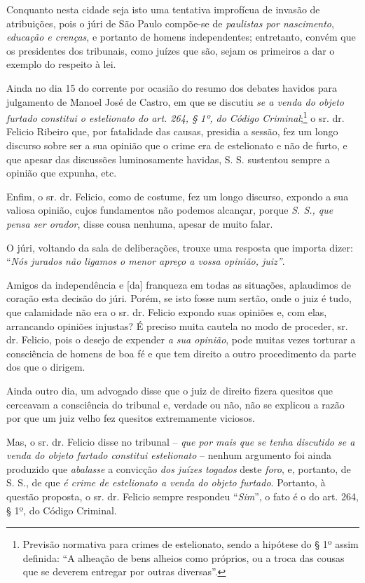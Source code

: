 {Conquanto nesta cidade seja isto uma tentativa improfícua de invasão de
atribuições, pois o júri de São Paulo compõe-se de \emph{paulistas por
nascimento}, \emph{educação e crenças}, e portanto de homens
independentes; entretanto, convém que os presidentes dos tribunais, como
juízes que são, sejam os primeiros a dar o exemplo do respeito à lei.

Ainda no dia 15 do corrente por ocasião do resumo dos debates havidos
para julgamento de Manoel José de Castro, em que se discutiu \emph{se a
venda do objeto furtado constitui o estelionato do art. 264, § 1º, do
Código Criminal};\footnote{ Previsão normativa para crimes de
  estelionato, sendo a hipótese do § 1º assim definida: ``A alheação de
  bens alheios como próprios, ou a troca das cousas que se deverem
  entregar por outras diversas''.} o sr. dr. Felicio Ribeiro que, por
fatalidade das causas, presidia a sessão, fez um longo discurso sobre
ser a sua opinião que o crime era de estelionato e não de furto, e que
apesar das discussões luminosamente havidas, S. S. sustentou sempre a
opinião que expunha, etc.

Enfim, o sr. dr. Felicio, como de costume, fez um longo discurso,
expondo a sua valiosa opinião, cujos fundamentos não podemos alcançar,
porque \emph{S. S., que pensa ser orador}, disse cousa nenhuma, apesar
de muito falar.

O júri, voltando da sala de deliberações, trouxe uma resposta que
importa dizer: ``\emph{Nós jurados não ligamos o menor apreço a vossa
opinião, juiz''}.

Amigos da independência e {[}da{]} franqueza em todas as situações,
aplaudimos de coração esta decisão do júri. Porém, se isto fosse num
sertão, onde o juiz é tudo, que calamidade não era o sr. dr. Felicio
expondo suas opiniões e, com elas, arrancando opiniões injustas? É
preciso muita cautela no modo de proceder, sr. dr. Felicio, pois o
desejo de expender \emph{a sua opinião}, pode muitas vezes torturar a
consciência de homens de boa fé e que tem direito a outro procedimento
da parte dos que o dirigem.

Ainda outro dia, um advogado disse que o juiz de direito fizera quesitos
que cerceavam a consciência do tribunal e, verdade ou não, não se
explicou a razão por que um juiz velho fez quesitos extremamente
viciosos.

Mas, o sr. dr. Felicio disse no tribunal -- \emph{que por mais que se
tenha discutido se a venda do objeto furtado constitui estelionato} --
nenhum argumento foi ainda produzido que \emph{abalasse} a convicção
\emph{dos juízes togados} deste \emph{foro}, e, portanto, de S. S., de
que \emph{é crime de estelionato a venda do objeto furtado}. Portanto, à
questão proposta, o sr. dr. Felicio sempre respondeu ``\emph{Sim}'', o
fato é o do art. 264, § 1º, do Código Criminal.

}
